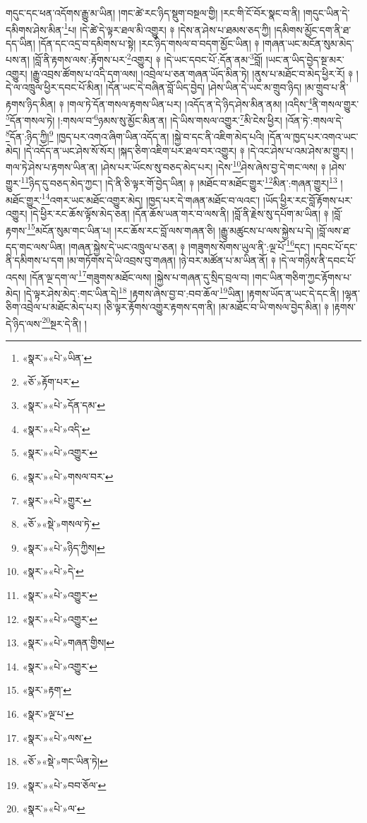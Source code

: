 གདུང་དང་ཕན་འདོགས་རྒྱུ་མ་ཡིན། །གང་ཚེ་རང་ཉིད་སྡུག་བསྔལ་གྱི། །རང་གི་ངོ་བོར་སྣང་བ་ནི། །གདུང་ཡིན་དེ་དམིགས་ཤེས་མིན་\footnote{«སྣར་»«པེ་»ཡིན་}པ། །དེ་ཚེ་དེ་ལྟར་ཐལ་མི་འགྱུར། ༈ །དེས་ན་ཤེས་པ་ཐམས་ཅད་ཀྱི། །དམིགས་མྱོང་དག་ནི་ཐ་དད་ཡིན། །དོན་དང་འདྲ་བ་དམིགས་པ་སྟེ། །རང་ཉིད་གསལ་བ་བདག་མྱོང་ཡིན། ༈ །གཞན་ཡང་མངོན་སུམ་མེད་པས་ན། །བློ་ནི་རྟགས་ལས་:རྟོགས་པར་\footnote{«ཅོ་»རྟོག་པར་}འགྱུར། ༈ །དེ་ཡང་དབང་པོ་:དོན་ནམ་\footnote{«སྣར་»«པེ་»དོན་དམ་}བློ། །ཡང་ན་ཡིད་བྱེད་སྔ་མར་འགྱུར། །རྒྱུ་འབྲས་ཚོགས་པ་འདི་དག་ལས། །འབྲེལ་པ་ཅན་གཞན་ཡོད་མིན་ཏེ། །ནུས་པ་མཐོང་བ་མེད་ཕྱིར་རོ། ༈ །དེ་ལ་འཁྲུལ་ཕྱིར་དབང་པོ་མིན། །དོན་ཡང་དེ་བཞིན་བློ་ཡིད་བྱེད། །ཤེས་ཡིན་དེ་ཡང་མ་གྲུབ་ཉིད། །མ་གྲུབ་པ་ནི་རྟགས་ཉིད་མིན། ༈ །གལ་ཏེ་དོན་གསལ་རྟགས་ཡིན་པར། །འདོད་ན་དེ་ཉིད་ཤེས་མིན་ནམ། །འདིས་\footnote{«སྣར་»«པེ་»འདི་}ནི་གསལ་གྱུར་\footnote{«སྣར་»«པེ་»འགྱུར་}དོན་གསལ་ཏེ། །:གསལ་བ་\footnote{«སྣར་»«པེ་»གསལ་བར་}ཉམས་སུ་མྱོང་མིན་ན། །དེ་ཡིས་གསལ་འགྱུར་\footnote{«སྣར་»«པེ་»གྱུར་}མི་ངེས་ཕྱིར། །འོན་ཏེ་:གསལ་དེ་\footnote{«ཅོ་»«སྡེ་»གསལ་ཏེ་}དོན་:ཉིད་ཀྱི།\footnote{«སྣར་»«པེ་»ཉིད་ཀྱིས།} །ཁྱད་པར་འགའ་ཞིག་ཡིན་འདོད་ན། །སྐྱེ་བ་དང་ནི་འཇིག་མེད་པའི། །དོན་ལ་ཁྱད་པར་འགའ་ཡང་མེད། །དེ་འདོད་ན་ཡང་ཤེས་སོ་སོར། །སྐད་ཅིག་འཇིག་པར་ཐལ་བར་འགྱུར། ༈ །དེ་འང་ཤེས་པ་འམ་ཤེས་མ་གྱུར། །གལ་ཏེ་ཤེས་པ་རྟགས་ཡིན་ན། །ཤེས་པར་ཡོངས་སུ་བཅད་མེད་པར། །དེས་\footnote{«སྣར་»«པེ་»དེ་}ཤེས་ཞེས་བྱ་དེ་གང་ལས། ༈ །ཤེས་གྱུར་\footnote{«སྣར་»«པེ་»འགྱུར་}ཉིད་དུ་བཅད་མེད་ཀྱང་། །དེ་ནི་ཅི་ལྟར་གོ་བྱེད་ཡིན། ༈ །མཐོང་བ་མཐོང་གྱུར་\footnote{«སྣར་»«པེ་»འགྱུར་}མིན་:གཞན་གྱུར།\footnote{«སྣར་»«པེ་»གཞན་གྱིས།} །མཐོང་གྱུར་\footnote{«སྣར་»«པེ་»འགྱུར་}འགར་ཡང་མཐོང་འགྱུར་མེད། །ཁྱད་པར་དེ་གཞན་མཐོང་བ་ལའང་། །ཡོད་ཕྱིར་རང་བློ་རྟོགས་པར་འགྱུར། །དེ་ཕྱིར་རང་ཆོས་ལྟོས་མེད་ཅན། །དོན་ཆོས་ཡན་གར་བ་ལས་ནི། །བློ་ནི་རྗེས་སུ་དཔོག་མ་ཡིན། ༈ །བློ་རྟགས་\footnote{«སྣར་»རྟག་}མངོན་སུམ་གང་ཡིན་པ། །རང་ཆོས་རང་བློ་ལས་གཞན་ཅི། །རྒྱུ་མཚུངས་པ་ལས་སྐྱེས་པ་དེ། །བློ་ལས་ཐ་དད་གང་ལས་ཡིན། །གཞན་སྐྱེས་དེ་ཡང་འཁྲུལ་པ་ཅན། ༈ །གཟུགས་སོགས་ཡུལ་ནི་:ལྔ་པོ་\footnote{«སྣར་»ལྔ་པ་}དང་། །དབང་པོ་དང་ནི་དམིགས་པ་དག །མ་གཏོགས་དེ་ཡི་འབྲས་བུ་གཞན། །ཉེ་བར་མཚོན་པ་མ་ཡིན་ནོ། ༈ །དེ་ལ་གཉིས་ནི་དབང་པོ་འདས། །དོན་ལྔ་དག་ལ་\footnote{«སྣར་»«པེ་»ལས་}གཟུགས་མཐོང་ལས། །སྐྱེས་པ་གཞན་དུ་སྲིད་བྲལ་བ། །གང་ཡིན་གཅིག་ཀྱང་རྟོགས་པ་མེད། །དེ་ལྟར་ཤེས་མེད་:གང་ཡིན་དེ།\footnote{«ཅོ་»«སྡེ་»གང་ཡིན་ཏེ།} །རྟགས་ཞེས་བྱ་བ་:བབ་ཆོལ་\footnote{«སྣར་»«པེ་»བབ་ཅོལ་}ཡིན། །རྟགས་ཡོད་ན་ཡང་དེ་དང་ནི། །ལྷན་ཅིག་འབྲེལ་པ་མཐོང་མེད་པར། །ཅི་ལྟར་རྟོགས་འགྱུར་རྟགས་དག་ནི། །མ་མཐོང་བ་ཡི་གསལ་བྱེད་མིན། ༈ །རྟགས་དེ་ཉིད་ལས་\footnote{«སྣར་»«པེ་»ལ་}སྔར་དེ་ནི། །
